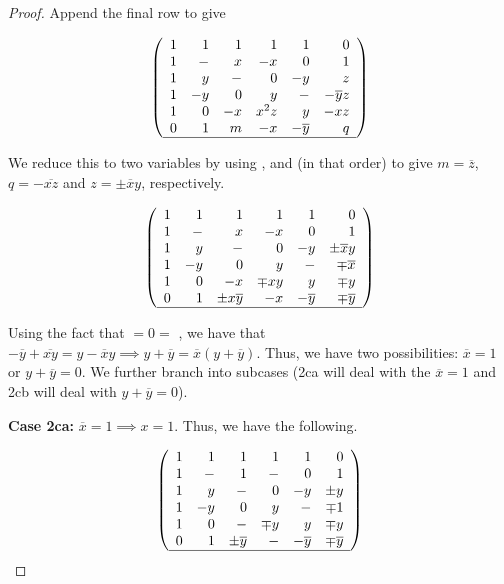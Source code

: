 \begin{lemma}
\begin{proof}
Append the final row to give

\begin{equation}  \label{mat:2c-5}
\left(\begin{array}{rrrrrr}
 1 &  1 & 1 & 1 & 1 & 0 \\
 1 &  - & x & -x & 0 & 1 \\
 1 &  y & - & 0 & -y & z \\
 1 &  -y & 0 & y & - & -\overline{y}z \\
 1 &  0 & -x & x^2z & y & -xz \\
 0 &  1 & m & -x & -\overline{y} & q \\ \hline
\end{array}\right)
\end{equation}

We reduce this to two variables by using ,  and  (in that order) to give $m = \overline{z}$, $q = -\overline{xz}$ and $z = \pm\overline{x}y$, respectively.

\begin{equation}  \label{mat:2c-6}
\left(\begin{array}{rrrrrr}
          1 &  1 & 1  &  1 &  1 & 0 \\
          1 &  - & x  & -x &  0 & 1 \\
          1 &  y & -  &  0 & -y & \pm \overline{x}y \\
          1 & -y & 0  &  y &  - & \mp\overline{x} \\
          1 &  0 & -x &  \mp xy &  y & \mp y \\
          0 &  1 & \pm x\overline{y}  & -x & -\overline{y} & \mp \overline{y} \\ \hline
         \end{array}\right)
\end{equation}

Using the fact that  $= 0 =$ , we have that $-\overline{y} + \overline{xy} = y-\overline{x}y\implies y+\overline{y} =\overline{x}(y+\overline{y})$. Thus, we have two possibilities: $\overline{x}=1$ or $y+\overline{y}=0$. We further branch into subcases (2ca will deal with the $\overline{x}=1$ and 2cb will deal with $y+\overline{y}=0$).

{\bf Case 2ca:} $\overline{x} = 1 \implies x = 1$. Thus, we have the following.

\begin{equation}  \label{mat:2ca-1}
\left(\begin{array}{rrrrrr}
                1 &  1 & 1  &  1 &  1 & 0 \\
                1 &  - & 1  & - &  0 & 1 \\
                1 &  y & -  &  0 & -y & \pm y \\
                1 & -y & 0  &  y &  - & \mp1 \\
                1 &  0 & - &  \mp y &  y & \mp y \\
                0 &  1 & \pm \overline{y}  & - & -\overline{y} & \mp \overline{y} \\ \hline
               \end{array}\right)
\end{equation}


\end{proof}
\end{lemma}
